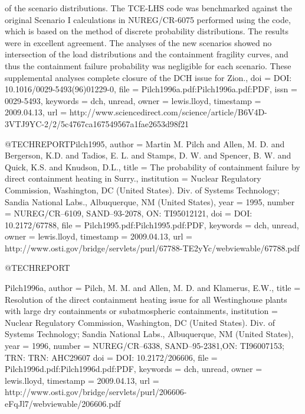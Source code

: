 {{{	of the scenario distributions. The TCE-LHS code was benchmarked against
	the original Scenario I calculations in NUREG/CR-6075 performed using
	the code, which is based on the method of discrete probability distributions.
	The results were in excellent agreement. The analyses of the new
	scenarios showed no intersection of the load distributions and the
	containment fragility curves, and thus the containment failure probability
	was negligible for each scenario. These supplemental analyses complete
	closure of the DCH issue for Zion.},
  doi = {DOI: 10.1016/0029-5493(96)01229-0},
  file = {Pilch1996a.pdf:Pilch1996a.pdf:PDF},
  issn = {0029-5493},
  keywords = {dch, unread},
  owner = {lewis.lloyd},
  timestamp = {2009.04.13},
  url = {http://www.sciencedirect.com/science/article/B6V4D-3VTJ9YC-2/2/5c4767ca167549567a1fae2653d98f21}
}

@TECHREPORT{Pilch1995,
  author = {Martin M. Pilch and Allen, M. D. and Bergerson, K.D. and Tadios,
	E. L. and Stamps, D. W. and Spencer, B. W. and Quick, K.S. and Knudson,
	D.L.},
  title = {The probability of containment failure by direct containment heating
	in Surry.},
  institution = {Nuclear Regulatory Commission, Washington, DC (United States). Div.
	of Systems Technology; Sandia National Labs., Albuquerque, NM (United
	States)},
  year = {1995},
  number = {NUREG/CR--6109, SAND--93-2078, ON: TI95012121},
  doi = {DOI: 10.2172/67788},
  file = {Pilch1995.pdf:Pilch1995.pdf:PDF},
  keywords = {dch, unread},
  owner = {lewis.lloyd},
  timestamp = {2009.04.13},
  url = {http://www.osti.gov/bridge/servlets/purl/67788-TE2yYc/webviewable/67788.pdf}
}

@TECHREPORT{Pilch1996a,
  author = {Pilch, M. M. and Allen, M. D. and Klamerus, E.W.},
  title = {Resolution of the direct containment heating issue for all Westinghouse
	plants with large dry containments or subatmospheric containments},
  institution = {Nuclear Regulatory Commission, Washington, DC (United States). Div.
	of Systems Technology; Sandia National Labs., Albuquerque, NM (United
	States)},
  year = {1996},
  number = {NUREG/CR--6338, SAND--95-2381,ON: TI96007153; TRN: TRN: AHC29607%
  doi = {DOI: 10.2172/206606},
  file = {Pilch1996d.pdf:Pilch1996d.pdf:PDF},
  keywords = {dch, unread},
  owner = {lewis.lloyd},
  timestamp = {2009.04.13},
  url = {http://www.osti.gov/bridge/servlets/purl/206606-eFqJl7/webviewable/206606.pdf}
}

}}
